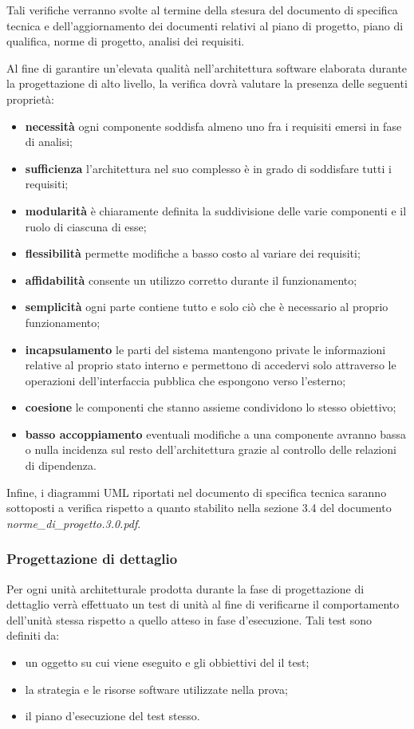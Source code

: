 Tali verifiche verranno svolte al termine della stesura del documento di specifica tecnica e dell'aggiornamento dei documenti relativi al piano di progetto, piano di qualifica, norme di progetto, analisi dei requisiti.

Al fine di garantire un'elevata qualità nell'architettura software elaborata durante la progettazione di alto livello, la verifica dovrà valutare la presenza delle seguenti proprietà:
\begin{itemize}
\item \textbf{necessità} ogni componente soddisfa almeno uno fra i requisiti emersi in fase di analisi;
\item \textbf{sufficienza} l'architettura nel suo complesso è in grado di soddisfare tutti i requisiti;
\item \textbf{modularità} è chiaramente definita la suddivisione delle varie componenti e il ruolo di ciascuna di esse;
\item \textbf{flessibilità} permette modifiche a basso costo al variare dei requisiti;
\item \textbf{affidabilità} consente un utilizzo corretto durante il funzionamento;
\item \textbf{semplicità} ogni parte contiene tutto e solo ciò che è necessario al proprio funzionamento;
\item \textbf{incapsulamento} le parti del sistema mantengono private le informazioni relative al proprio stato interno e permettono di accedervi solo attraverso le operazioni dell'interfaccia pubblica che espongono verso l'esterno;
\item \textbf{coesione} le componenti che stanno assieme condividono lo stesso obiettivo;
\item \textbf{basso accoppiamento} eventuali modifiche a una componente avranno bassa o nulla incidenza sul resto dell'architettura grazie al controllo delle relazioni di dipendenza.
\end{itemize}

Infine, i diagrammi UML riportati nel documento di specifica tecnica saranno sottoposti a verifica rispetto a quanto stabilito nella sezione 3.4 del documento \textit{norme\_di\_progetto.3.0.pdf}.

\subsubsection*{Progettazione di dettaglio}
Per ogni unità architetturale prodotta durante la fase di progettazione di dettaglio verrà effettuato un test di unità al fine di verificarne il comportamento dell'unità stessa rispetto a quello atteso in fase d'esecuzione. Tali test sono definiti da:
\begin{itemize}
  \item un oggetto su cui viene eseguito e gli obbiettivi del il test;
  \item la strategia e le risorse software utilizzate nella prova;
  \item il piano d'esecuzione del test stesso.
\end{itemize}

